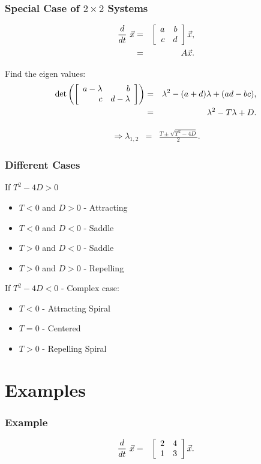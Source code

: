 \begin{frame}
  \frametitle{Special Case of $2\times 2$ Systems}

  \begin{eqnarray*}
    \deriv{~}{t} \vec{x} & = & \arrayTwo{a}{b}{c}{d} \vec{x}, \\
    & = & A \vec{x}.
  \end{eqnarray*}

  {
    Find the eigen values:
    \begin{eqnarray*}
      \det\lp\arrayTwo{a-\lambda}{b}{c}{d-\lambda}\rp & = & 
      \lambda^2 - (a+d) \lambda + (ad-bc), \\
      & = & \lambda^2 - T\lambda + D.
    \end{eqnarray*}
  }

  {
    \begin{eqnarray*}
      \Rightarrow \lambda_{1,2} & = & \frac{T\pm\sqrt{T^2-4D}}{2}.
    \end{eqnarray*}
  }


\end{frame}


\begin{frame}
  \frametitle{Different Cases}

  If $T^2-4D>0$
  \begin{itemize}
  \item $T<0$ and $D>0$ - Attracting
  \item $T<0$ and $D<0$ - Saddle
  \item $T>0$ and $D<0$ - Saddle
  \item $T>0$ and $D>0$ - Repelling
  \end{itemize}

  If $T^2-4D<0$ - Complex case:
  \begin{itemize}
  \item $T<0$ - Attracting Spiral
  \item $T=0$ - Centered
  \item $T>0$ - Repelling Spiral
  \end{itemize}


\end{frame}

\section{Examples}

\begin{frame}
  \frametitle{Example}

  \begin{eqnarray*}
    \deriv{~}{t} \vec{x} & = & \arrayTwo{2}{4}{1}{3} \vec{x}.
  \end{eqnarray*}

\end{frame}


